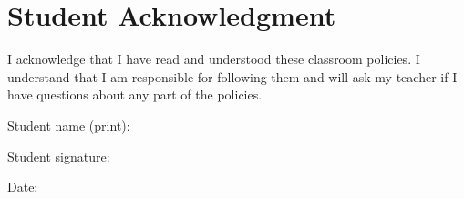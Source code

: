 \documentclass[10pt]{article}
\begin{document}
\section{Student Acknowledgment}

I acknowledge that I have read and understood these classroom policies. I understand that I am responsible for following them and will ask my teacher if I have questions about any part of the policies.

\vspace{2em}

\noindent
Student name (print): \hrulefill

\vspace{2em}

\noindent
Student signature: \hrulefill

\vspace{2em}

\noindent
Date: \hrulefill
\end{document}

